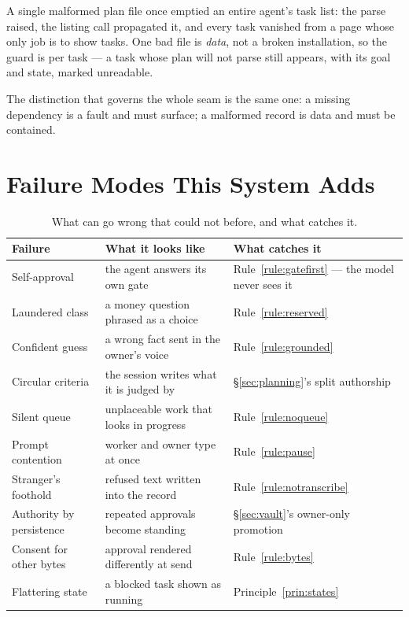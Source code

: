 \documentclass[11pt]{article}
\begin{document}
A single malformed plan file once emptied an entire agent's task list: the parse raised, the listing call propagated it, and every task vanished from a page whose only job is to show tasks. One bad file is \emph{data}, not a broken installation, so the guard is per task --- a task whose plan will not parse still appears, with its goal and state, marked unreadable.

The distinction that governs the whole seam is the same one: a missing dependency is a fault and must surface; a malformed record is data and must be contained.

\section{Failure Modes This System Adds}
\label{sec:failures}

\begin{table}[h]
\centering\small
\caption{What can go wrong that could not before, and what catches it.}
\label{tab:failures}
\begin{tabular}{@{}L{3.9cm}L{4.6cm}L{4.5cm}@{}}
\toprule
\textbf{Failure} & \textbf{What it looks like} & \textbf{What catches it} \\
\midrule
Self-approval & the agent answers its own gate & Rule~\ref{rule:gatefirst} --- the model never sees it \\
Laundered class & a money question phrased as a choice & Rule~\ref{rule:reserved} \\
Confident guess & a wrong fact sent in the owner's voice & Rule~\ref{rule:grounded} \\
Circular criteria & the session writes what it is judged by & \S\ref{sec:planning}'s split authorship \\
Silent queue & unplaceable work that looks in progress & Rule~\ref{rule:noqueue} \\
Prompt contention & worker and owner type at once & Rule~\ref{rule:pause} \\
Stranger's foothold & refused text written into the record & Rule~\ref{rule:notranscribe} \\
Authority by persistence & repeated approvals become standing & \S\ref{sec:vault}'s owner-only promotion \\
Consent for other bytes & approval rendered differently at send & Rule~\ref{rule:bytes} \\
Flattering state & a blocked task shown as running & Principle~\ref{prin:states} \\
\bottomrule
\end{tabular}
\end{table}
\end{document}
